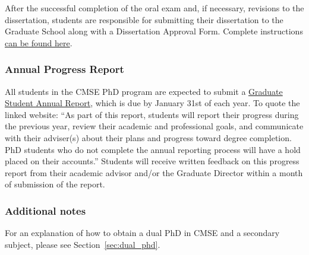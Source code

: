\noindent
After the successful completion of the oral exam and, if necessary,
revisions to the dissertation, students are responsible for submitting
their dissertation to the Graduate School along with a Dissertation
Approval Form.  Complete
instructions \href{https://grad.msu.edu/etd}{can be found here}.



\vspace{3mm}
\subsubsection{Annual Progress Report}

All students in the CMSE PhD program are expected to submit a
\href{https://www.egr.msu.edu/academics/graduate/graduate-student-annual-reporting-requirements}{Graduate
  Student Annual Report}, which is due by January 31st of each year.
To quote the linked website:  ``As part of this report, students will
report their progress during the previous year, review their academic
and professional goals, and communicate with their adviser(s) about
their plans and progress toward degree completion. PhD students who do
not complete the annual reporting process will have a hold placed on
their accounts.''  Students will receive written feedback on this progress
report from their academic advisor and/or the Graduate Director within
a month of submission of the report.

\vspace{3mm}
\subsubsection{Additional notes}

For an explanation of how to obtain a dual PhD in CMSE and a secondary
subject, please see Section~\ref{sec:dual_phd}.




